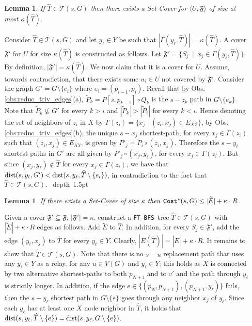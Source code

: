 \documentclass[12pt]{article}
\newtheorem{lemma}[theorem]{Lemma}
\def\Set{\mathfrak{F}}
\def\Cost{\mbox{\tt Cost}}
\newcommand{\dist}{\mbox{\rm dist}}
\def\Proof{\par\noindent{\bf Proof:~}}
\def\blackslug{\hbox{\hskip 1pt \vrule width 4pt height 8pt
    depth 1.5pt \hskip 1pt}}
\def\QED{\quad\blackslug\lower 8.5pt\null\par}
\def\FTBFS{\mbox{\tt FT-BFS}}
\begin{document}
\begin{lemma}
\label{cl:reduc_a}
If $\widehat{T} \in \mathcal{T}(s,G)$ then
there exists a Set-Cover for $\langle U, \Set \rangle$
of size at most $\kappa(\widehat{T})$.
\end{lemma}
\Proof
Consider $\widehat{T} \in \mathcal{T}(s,G)$ and let $y_\ell \in Y$ be such that
$|\Gamma(y_\ell,\widehat{T})|=\kappa(\widehat{T})$.
A cover $\Set'$ for $U$ for size $\kappa(\widehat{T})$ is constructed as follows.
Let $\Set'=\{S_j ~\mid~ x_j \in  \Gamma(y_\ell,\widehat{T})\}$.
By definition, $|\Set'| = \kappa(\widehat{T})$.
We now claim that it is a cover for $U$.
Assume, towards contradiction, that there exists some $u_i \in U$
not covered by $\Set'$. Consider the graph $G'=G \setminus \{e_i\}$ where $e_i=(p_{i-1}, p_{i})$. Recall that by Obs. \ref{obs:reduc_triv_edges}(a), $\widetilde{P}_k=P[s, p_{k-1}] \circ Q_k$ is the $s-z_k$ path in $G \setminus \{e_k\}$. Note that $\widetilde{P}_k \nsubseteq G'$ for every $k>i$
and $|\widetilde{P}_k|>|\widetilde{P}_i|$ for every $k<i$.
Hence denoting the set of neighbors of $z_i$ in $X$ by
$\Gamma(z_i)=\{x_j \mid (z_i,x_j) \in E_{XZ}\}$, by Obs. \ref{obs:reduc_triv_edges}(b),
the unique $s-x_j$ shortest-path, for every $x_j \in \Gamma(z_i)$ such that $(z_i, x_j) \in E_{XY}$, is given by $P'_j=\widetilde{P}_i \circ (z_i, x_j)$.
Therefore the $s-y_\ell$ shortest-paths in $G'$ are all given by $P'_j \circ (x_j, y_\ell)$, for every $x_j \in \Gamma(z_i)$. But since $(x_j,y_\ell) \notin \widehat{T}$ for every $x_j \in \Gamma(z_i)$, we have that $\dist(s, y_\ell, G')<\dist(s, y_\ell, \widehat{T}\setminus \{e_i\})$, in contradiction to the fact that $\widehat{T} \in \mathcal{T}(s,G)$.
\QED
\begin{lemma}
\label{cl:reduc_b}
If there exists a Set-Cover of size $\kappa$ then
$\Cost^*(s, G) \leq |\widetilde{E}|+\kappa \cdot R$.
\end{lemma}
\Proof
Given a cover $\Set' \subseteq \Set$, $|\Set'|=\kappa$, construct a \FTBFS\ tree $\widehat{T} \in \mathcal{T}(s,G)$ with $|\widetilde{E}|+\kappa \cdot R$ edges as follows. Add $\widetilde{E}$ to $\widehat{T}$. In addition, for every $S_j \in \Set'$, add the edge $(y_\ell, x_j)$ to $\widehat{T}$ for every $y_\ell \in Y$. Clearly, $|E(\widehat{T})|=|\widetilde{E}|+\kappa \cdot R$. It remains to show that $\widehat{T} \in \mathcal{T}(s,G)$.
Note that there is no $s-u$ replacement path that uses any $y_\ell \in Y$ as a relay, for any $u \in V(G)$ and $y_\ell \in Y$; this holds as $X$ is connected by two alternative shortest-paths to both $p_{N+1}$ and to $v'$ and the path through $y_\ell$ is strictly longer. In addition, if the edge $e \in \{(p_{N}, p_{N+1}),(p_{N+1}, y_{\ell})\}$ fails, then the $s-y_{\ell}$ shortest path in $G \setminus \{e\}$ goes through any neighbor $x_j$ of $y_{\ell}$. Since each $y_{\ell}$ has at least one $X$ node neighbor in $\widehat{T}$, it holds that $\dist(s, y_{\ell},\widehat{T} \setminus \{e\})=\dist(s, y_{\ell},G \setminus \{e\})$.
\end{document}
